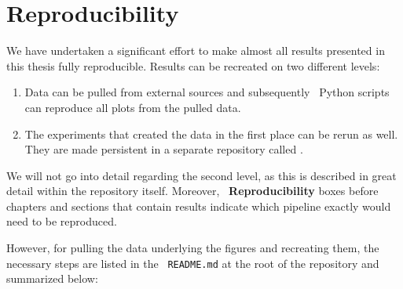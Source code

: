 \documentclass[\relativeRoot/main.tex]{subfiles}
\begin{document}
\section{Reproducibility}
\label{sec:intro:reproducibility}

We have undertaken a significant effort to make almost all results presented in this thesis fully reproducible. Results can be recreated on two different levels:

\begin{enumerate}[label={(\arabic*)}]
    \item Data can be pulled from external sources and subsequently ~Python scripts can reproduce all plots from the pulled data.
    \item The experiments that created the data in the first place can be rerun as well. They are made persistent in a separate repository called .
\end{enumerate}

We will not go into detail regarding the second level, as this is described in great detail within the  repository itself. Moreover, ~\textbf{Reproducibility} boxes before chapters and sections that contain results indicate which pipeline exactly would need to be reproduced.

However, for pulling the data underlying the figures and recreating them, the necessary steps are listed in the ~\texttt{README.md} at the root of the  repository and summarized below:
\end{document}
